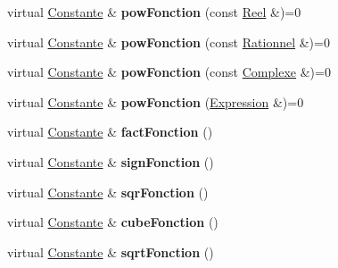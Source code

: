 \begin{DoxyCompactItemize}
\item 
\hypertarget{class_constante_aac4655c82f3adc298c242c1858a185de}{virtual \hyperlink{class_constante}{Constante} \& {\bfseries pow\-Fonction} (const \hyperlink{class_reel}{Reel} \&)=0}\label{class_constante_aac4655c82f3adc298c242c1858a185de}

\item 
\hypertarget{class_constante_acfa643e1f95d98b3eafb4275bbb533d5}{virtual \hyperlink{class_constante}{Constante} \& {\bfseries pow\-Fonction} (const \hyperlink{class_rationnel}{Rationnel} \&)=0}\label{class_constante_acfa643e1f95d98b3eafb4275bbb533d5}

\item 
\hypertarget{class_constante_aae63d1d974ef6fe0f516ce1cfcaff5eb}{virtual \hyperlink{class_constante}{Constante} \& {\bfseries pow\-Fonction} (const \hyperlink{class_complexe}{Complexe} \&)=0}\label{class_constante_aae63d1d974ef6fe0f516ce1cfcaff5eb}

\item 
\hypertarget{class_constante_ae7639614d627f4a87e477095e65b4896}{virtual \hyperlink{class_constante}{Constante} \& {\bfseries pow\-Fonction} (\hyperlink{class_expression}{Expression} \&)=0}\label{class_constante_ae7639614d627f4a87e477095e65b4896}

\item 
\hypertarget{class_constante_a52dd5fcfeb66534183e9419c222c6960}{virtual \hyperlink{class_constante}{Constante} \& {\bfseries fact\-Fonction} ()}\label{class_constante_a52dd5fcfeb66534183e9419c222c6960}

\item 
\hypertarget{class_constante_abf6fa0c8026ebcbf5c1a0d55b56f5d5b}{virtual \hyperlink{class_constante}{Constante} \& {\bfseries sign\-Fonction} ()}\label{class_constante_abf6fa0c8026ebcbf5c1a0d55b56f5d5b}

\item 
\hypertarget{class_constante_a89475969e57f022a38cc3fb6617e3e29}{virtual \hyperlink{class_constante}{Constante} \& {\bfseries sqr\-Fonction} ()}\label{class_constante_a89475969e57f022a38cc3fb6617e3e29}

\item 
\hypertarget{class_constante_a19851e590e8c40a4f3fddd3e78780a05}{virtual \hyperlink{class_constante}{Constante} \& {\bfseries cube\-Fonction} ()}\label{class_constante_a19851e590e8c40a4f3fddd3e78780a05}

\item 
\hypertarget{class_constante_a94668c82b50be66607e701d989d5f725}{virtual \hyperlink{class_constante}{Constante} \& {\bfseries sqrt\-Fonction} ()}\label{class_constante_a94668c82b50be66607e701d989d5f725}


\end{DoxyCompactItemize}
